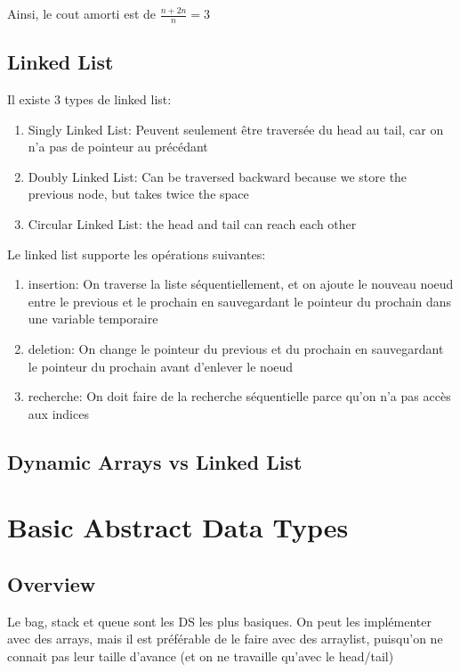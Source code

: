 \documentclass{article}
\begin{document}
Ainsi, le cout amorti est de $ \frac{n+2n}{n} = 3 $

\subsection{Linked List}

Il existe 3 types de linked list:
\begin{enumerate}
    \item Singly Linked List: Peuvent seulement être traversée du head
	au tail, car on n'a pas de pointeur au précédant
    \item Doubly Linked List: Can be traversed backward because we
	store the previous node, but takes twice the space
    \item Circular Linked List: the head and tail can reach each other
\end{enumerate}

Le linked list supporte les opérations suivantes:
\begin{enumerate}
    \item insertion: On traverse la liste séquentiellement, et on ajoute
	le nouveau noeud entre le previous et le prochain en sauvegardant
	le pointeur du prochain dans une variable temporaire
    \item deletion: On change le pointeur du previous et du prochain en
	sauvegardant le pointeur du prochain avant d'enlever le noeud
    \item recherche: On doit faire de la recherche séquentielle parce
	qu'on n'a pas accès aux indices
\end{enumerate}

\subsection{Dynamic Arrays vs Linked List}

\section{Basic Abstract Data Types}

\subsection{Overview}

Le bag, stack et queue sont les DS les plus basiques. On peut les
implémenter avec des arrays, mais il est préférable de le faire avec des
arraylist, puisqu'on ne connait pas leur taille d'avance (et on ne
travaille qu'avec le head/tail)
\end{document}
